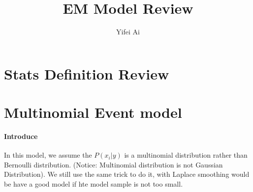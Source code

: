 \documentclass[12pt]{article}
\begin{document}
\title{EM Model Review}
\author{Yifei Ai}
\maketitle

\section{Stats Definition Review}

\section{Multinomial Event model}

\paragraph{Introduce}

In this model, we assume the $P(x_i|y)$ is a multinomial distribution rather than Bernoulli distribution. (Notice: Multinomial distribution is not Gaussian Distribution). We still use the same trick to do it, with Laplace smoothing would be have a good model if hte model sample is not too small.
\end{document}
